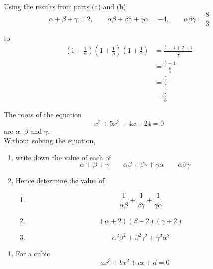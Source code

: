 \documentclass[leqno]{article}
\begin{document}
\begin{enumerate}[
  label=\textbf{\arabic*.},
  leftmargin=*,
  topsep=0pt,
  partopsep=0pt,
  parsep=0pt
]
\begin{djsSolution}
\begin{enumerate}[label=\textbf{(\alph*)}]
  Using the results from parts (a) and (b):
  \[
  \alpha+\beta+\gamma=2,\qquad
  \alpha\beta+\beta\gamma+\gamma\alpha=-4,\qquad
  \alpha\beta\gamma=\frac{8}{3}
  \]

  so
  \begin{align*}
  \left(1+\frac{1}{\alpha}\right)\left(1+\frac{1}{\beta}\right)\left(1+\frac{1}{\gamma}\right)
  &=\frac{\frac{8}{3}-4+2+1}{\frac{8}{3}} \\
  &=\frac{\frac{8}{3}-1}{\frac{8}{3}} \\
  &=\frac{\frac{5}{3}}{\frac{8}{3}} \\
  &=\frac{5}{8}
  \end{align*}
\end{enumerate}
\end{djsSolution}


\newpage

\questionitem

The roots of the equation
\[
x^3 + 5x^2 - 4x - 24 = 0
\]
are $\alpha$, $\beta$ and $\gamma$. \\

Without solving the equation,
\begin{enumerate}[label=\textbf{(\alph*)}]
  \item write down the value of each of
  \[
  \alpha + \beta + \gamma \qquad \alpha\beta + \beta\gamma + \gamma\alpha \qquad \alpha\beta\gamma
  \]
  \item Hence determine the value of
  \begin{enumerate}[label=(\roman*)]
    \item \[
    \frac{1}{\alpha\beta} + \frac{1}{\beta\gamma} + \frac{1}{\gamma\alpha}
    \]
    \item \[
    (\alpha + 2)(\beta + 2)(\gamma + 2)
    \]
    \item \[
    \alpha^2\beta^2 + \beta^2\gamma^2 + \gamma^2\alpha^2
    \]
  \end{enumerate}
\end{enumerate}

\vspace*{10pt}

\begin{djsSolution}
\begin{enumerate}[label=\textbf{(\alph*)}]
  \item For a cubic
  \[
  ax^3+bx^2+cx+d=0
  \]


\end{enumerate}
\end{djsSolution}
\end{enumerate}
\end{document}
